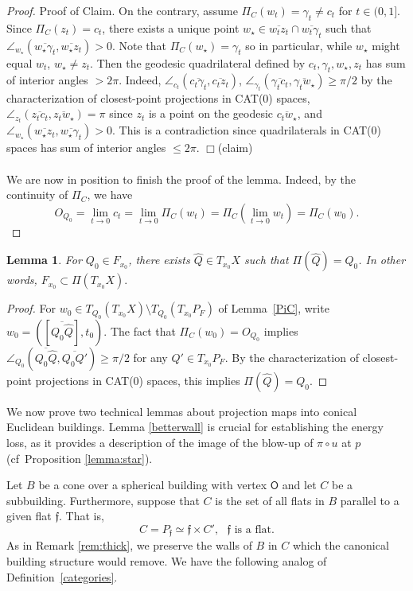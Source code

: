 \documentclass[12pt]{amsart}
\newtheorem{lemma}[theorem]{Lemma}
\theoremstyle{definition}
\numberwithin{equation}{section}
\begin{document}
\begin{proof}
{\sc Proof of Claim.} On the contrary, assume $\Pi_C(w_t)=\gamma_t \neq c_t$ for $t \in (0,1]$.  Since $\Pi_C(z_t)=c_t$, there exists a unique point $w_\star \in \overline{w_t z_t} \cap \overline {w_t \gamma_t}$ such that $\angle_{w_\star}({\overline{w_\star \gamma_t}, \overline {w_\star z_t}})>0$. Note that $\Pi_C(w_\star)=\gamma_t$ so in particular, while $w_\star$ might equal $w_t$, $w_\star \neq z_t$. Then the geodesic quadrilateral defined by $c_t, \gamma_t, w_\star, z_t$ has sum of interior angles $> 2\pi$.  Indeed, 
$\angle_{c_t}(\overline{c_t\gamma_t},\overline{c_tz_t})$,  $\angle_{\gamma_t}(\overline{\gamma_tc_t},\overline{\gamma_tw_\star}) \ge \pi/2$ by the characterization of closest-point projections in CAT(0) spaces, $\angle_{z_t}(\overline{z_tc_t}, \overline{z_tw_\star})=\pi$ since $z_t$ is a point on the geodesic $\overline{c_tw_\star}$, and $\angle_{w_\star}(\overline{w_\star z_t}, \overline{w_\star\gamma_t})>0$.  This is a contradiction since  quadrilaterals in CAT(0) spaces has sum of interior angles $\leq 2\pi$.  
\hfill $\Box$(claim)
\\
\\
We are now in position to finish the proof of the lemma. Indeed, by the continuity of $\Pi_C$, we have
\[
O_{Q_0}=\lim_{t \to 0} c_t=\lim_{t \to 0} \Pi_C(w_t) = \Pi_C (\lim_{t \to 0} w_t) = \Pi_C(w_0).
\]
\end{proof}

\begin{lemma} \label{Q}
For $Q_0 \in F_{x_0}$, there exists $\hat{Q} \in T_{x_0}X$ such that $\Pi(\hat{Q})=Q_0$.  In other words, $F_{x_0} \subset \Pi(T_{x_0}X).$
\end{lemma}

\begin{proof}
For $w_0 \in T_{Q_0}(T_{x_0}X) \setminus T_{Q_0}(T_{x_0}P_F)$ of Lemma~\ref{PiC},  write $w_0=([\overline{Q_0\hat{Q}}], t_0)$.  The fact that  $\Pi_C(w_0)=O_{Q_0}$ implies  $\angle_{Q_0}(\overline{Q_0\hat{Q}}, \overline{Q_0Q'}) \geq \pi/2$ for any $Q' \in T_{x_0}P_F$. By the characterization of closest-point projections in CAT(0) spaces, this implies $\Pi(\hat{Q})=Q_0$.
\end{proof}

We now prove two technical lemmas about projection maps into conical Euclidean buildings.  Lemma \ref{betterwall} is crucial for establishing the energy loss, as it provides a description of the image of the blow-up of $\pi \circ u$ at $p$ (cf~Proposition \ref{lemma:star}). 
 
 Let  $B$ be a cone over a spherical building with vertex $\mathsf{O}$ and let $C$ be a subbuilding. Furthermore, suppose that $C$ is the set of all flats in $B$ parallel to a given flat $\mathfrak f$. That is, 
\[
C=P_{\mathfrak f} \simeq \mathfrak f \times C', \ \ \ \mathfrak f \mbox{ is a flat}.
\]
As in Remark \ref{rem:thick}, we preserve the walls of $B$ in $C$ which the canonical building structure would remove.  We have the following analog of Definition~\ref{categories}.
\end{document}
